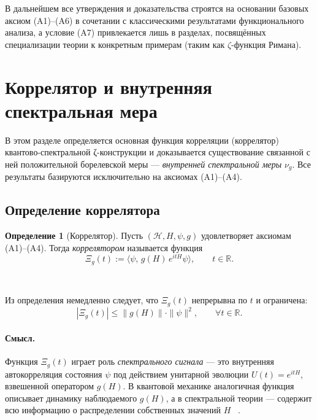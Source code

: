 \documentclass{article}
\numberwithin{equation}{section}
\theoremstyle{plain}
\theoremstyle{definition}
\newtheorem{definition}{Определение}
\theoremstyle{remark}
\def\cdot{·}\def\times{×}\def\pm{±}\def\mp{∓}\def\approx{≈}%
\begin{document}
\noindent
В дальнейшем все утверждения и доказательства строятся на основании базовых аксиом (A1)–(A6) в сочетании с классическими результатами функционального анализа, а условие (A7) привлекается лишь в разделах, посвящённых специализации теории к конкретным примерам (таким как $\zeta$-функция Римана).
\clearpage

\section{Коррелятор и внутренняя спектральная мера}
\label{sec:correlator_measure}

\noindent
В этом разделе определяется основная функция корреляции (коррелятор) квантово-спектральной ζ-конструкции и доказывается существование связанной с ней положительной борелевской меры — \emph{внутренней спектральной меры} $\nu_g$.  
Все результаты базируются исключительно на аксиомах (A1)–(A4).

\subsection{Определение коррелятора}
\label{subsec:correlator_def}

\begin{definition}[Коррелятор]
Пусть $(\mathcal H,H,\psi,g)$ удовлетворяет аксиомам (A1)–(A4).  
Тогда \emph{коррелятором} называется функция
\begin{equation}
\label{eq:correlator} 
\Xi_g(t)
:=\langle\psi,\,g(H)\,e^{itH}\psi\rangle,
\qquad t\in\mathbb R.
\end{equation}
\end{definition}~\cite{ReedSimonII}

\noindent
Из определения немедленно следует, что $\Xi_g(t)$ непрерывна по $t$ и ограничена:
\begin{equation}
|\Xi_g(t)|
\le 
\|g(H)\|\cdot\|\psi\|^2,
\qquad \forall t\in\mathbb R.
\end{equation}

\paragraph{Смысл.}  
Функция $\Xi_g(t)$ играет роль \emph{спектрального сигнала} — это внутренняя автокорреляция состояния $\psi$ под действием унитарной эволюции $U(t)=e^{itH}$, взвешенной оператором $g(H)$.  
В квантовой механике аналогичная функция описывает динамику наблюдаемого $g(H)$, а в спектральной теории — содержит всю информацию о распределении собственных значений $H$ ~\cite{Gutzwiller1990}.
\end{document}
